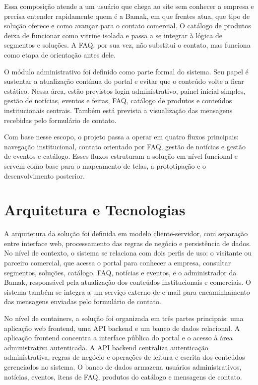 \documentclass[portuguese]{sbcreviews-2025}
\begin{document}
Essa composição atende a um usuário que chega ao site sem conhecer a empresa e precisa entender rapidamente quem é a Bamak, em que frentes atua, que tipo de solução oferece e como avançar para o contato comercial. O catálogo de produtos deixa de funcionar como vitrine isolada e passa a se integrar à lógica de segmentos e soluções. A FAQ, por sua vez, não substitui o contato, mas funciona como etapa de orientação antes dele.

O módulo administrativo foi definido como parte formal do sistema. Seu papel é sustentar a atualização contínua do portal e evitar que o conteúdo volte a ficar estático. Nessa área, estão previstos login administrativo, painel inicial simples, gestão de notícias, eventos e feiras, FAQ, catálogo de produtos e conteúdos institucionais centrais. Também está prevista a visualização das mensagens recebidas pelo formulário de contato.

Com base nesse escopo, o projeto passa a operar em quatro fluxos principais: navegação institucional, contato orientado por FAQ, gestão de notícias e gestão de eventos e catálogo. Esses fluxos estruturam a solução em nível funcional e servem como base para o mapeamento de telas, a prototipação e o desenvolvimento posterior.

\section{Arquitetura e Tecnologias}

A arquitetura da solução foi definida em modelo cliente-servidor, com separação entre interface web, processamento das regras de negócio e persistência de dados. No nível de contexto, o sistema se relaciona com dois perfis de uso: o visitante ou parceiro comercial, que acessa o portal para conhecer a empresa, consultar segmentos, soluções, catálogo, FAQ, notícias e eventos, e o administrador da Bamak, responsável pela atualização dos conteúdos institucionais e comerciais. O sistema também se integra a um serviço externo de e-mail para encaminhamento das mensagens enviadas pelo formulário de contato.

No nível de containers, a solução foi organizada em três partes principais: uma aplicação web frontend, uma API backend e um banco de dados relacional. A aplicação frontend concentra a interface pública do portal e o acesso à área administrativa autenticada. A API backend centraliza autenticação administrativa, regras de negócio e operações de leitura e escrita dos conteúdos gerenciados no sistema. O banco de dados armazena usuários administrativos, notícias, eventos, itens de FAQ, produtos do catálogo e mensagens de contato.
\end{document}
